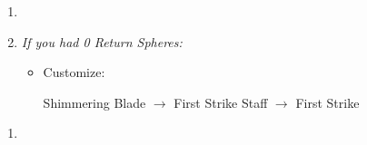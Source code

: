\begin{spheregrid}
\begin{itemize}
\begin{itemize}
\begin{itemize}
                \end{itemize}
        \end{itemize}
    \end{itemize}
\end{spheregrid}
\bothcb \wincb \losscb
\begin{enumerate}[resume]
    \item \formation{\tidus}{\auron}{\yuna}
    \item \textit{If you had 0 Return Spheres:}
        \begin{itemize}
            \item Customize:
                \begin{itemize}
                    \auronf Shimmering Blade $\rightarrow$ First Strike
                    \yunaf Staff $\rightarrow$ First Strike
                \end{itemize}
        \end{itemize}
\end{enumerate}
\begin{enumerate}[resume]
    \item {\large \save}
\end{enumerate}
